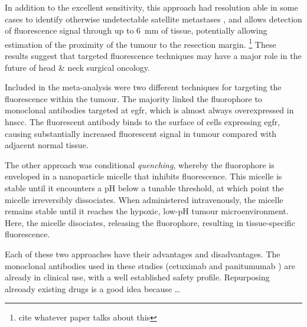 In addition to the excellent sensitivity, this approach had resolution able in some cases to identify otherwise undetectable satellite metastases \cite{voskuilf.j.ImageguidedSurgeryTumor2019}, and allows detection of fluorescence signal through up to \SI{6}{\milli\metre} of tissue, potentially allowing estimation of the proximity of the tumour to the resection margin. \footnote{cite whatever paper talks about this}
These results suggest that targeted fluorescence techniques may have a major role in the future of head \& neck surgical oncology.

Included in the meta-analysis were two different techniques for targeting the fluorescence within the tumour.
The majority linked the fluorophore to monoclonal antibodies  targeted at \gls{egfr}, which is almost always overexpressed in \gls{hnscc}\cite{chungIncreasedEpidermalGrowth2016}.
The fluorescent antibody binds to the surface of cells expressing \gls{egfr}, causing substantially increased fluorescent signal in tumour compared with adjacent normal tissue.

The other approach was conditional \textit{quenching}, whereby the fluorophore is enveloped in a nanoparticle micelle that inhibits fluorescence\cite{voskuilExploitingMetabolicAcidosis2020}.
This micelle is stable until it encounters a pH below a tunable threshold, at which point the micelle irreversibly dissociates. 
When administered intravenously, the micelle remains stable until it reaches the hypoxic, low-pH tumour microenvironment. 
Here, the micelle disociates, releasing the fluorophore, resulting in tissue-specific fluorescence.

Each of these two approaches have their advantages and disadvantages.
The monoclonal antibodies used in these studies (cetuximab \cite{warramFluorescenceImagingLocalize2016, voskuilf.j.FluorescenceguidedImagingResection2020}and panitumumab \cite{gaor.w.DeterminationTumorMargins2018, vankeulenRapidNoninvasiveFluorescence2019}) are already in clinical use, with a well established safety profile.
Repurposing alreoady existing drugs is a good idea because \ldots

